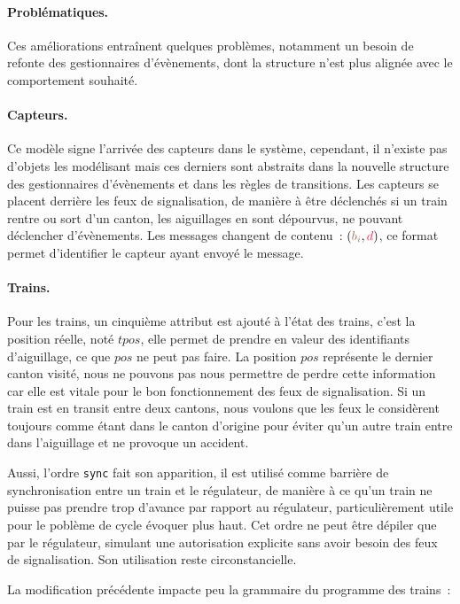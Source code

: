 \documentclass[oneside, a4paper, 11pt]{book}
\newcommand{\todoMV}[2][]{\todo[color=green, #1]{#2}}
\newcommand{\dirFmt}[1]{{\color{dircolor} #1}}
\newcommand{\posFmt}[1]{{\color{poscolor}{#1}}}
\newcommand{\bid}[1]{\ensuremath{\posFmt{b_{#1}}}}
\begin{document}
\paragraph{Problématiques.} Ces améliorations entraînent quelques problèmes, notamment un besoin de refonte des gestionnaires d'évènements, dont la structure n'est plus alignée avec le comportement souhaité. \todoMV{Pertinant mais pas clair}

\paragraph{Capteurs.} Ce modèle signe l'arrivée des capteurs dans le système, cependant, il n'existe pas d'objets les modélisant mais ces derniers sont abstraits dans la nouvelle structure des gestionnaires d'évènements et dans les règles de transitions.
Les capteurs se placent derrière les feux de signalisation, de manière à être déclenchés si un train rentre ou sort d'un canton, les aiguillages en sont dépourvus, ne pouvant déclencher d'évènements. Les messages changent de contenu~: $(\bid{i},\dirFmt{d})$, ce format permet d'identifier le capteur ayant envoyé le message.

\paragraph{Trains.} Pour les trains, un cinquième attribut est ajouté à l'état des trains, c'est la position réelle, noté $tpos$, elle permet de prendre en valeur des identifiants d'aiguillage, ce que $pos$ ne peut pas faire.
La position $pos$ représente le dernier canton visité, nous ne pouvons pas nous permettre de perdre cette information car elle est vitale pour le bon fonctionnement des feux de signalisation. Si un train est en transit entre deux cantons, nous voulons que les feux le considèrent toujours comme étant dans le canton d'origine pour éviter qu'un autre train entre dans l'aiguillage et ne provoque un accident.

Aussi, l'ordre \texttt{sync} fait son apparition, il est utilisé comme barrière de synchronisation entre un train et le régulateur, de manière à ce qu'un train ne puisse pas prendre trop d'avance par rapport au régulateur, particulièrement utile pour le poblème de cycle évoquer plus haut. Cet ordre ne peut être dépiler que par le régulateur, simulant une autorisation explicite sans avoir besoin des feux de signalisation.
Son utilisation reste circonstancielle.

\begin{sidebox}
		La modification précédente impacte peu la grammaire du programme des trains~:
	\vspace{0.3cm}\\
	\begin{grammar}
	\end{grammar}
\end{sidebox}
\end{document}
